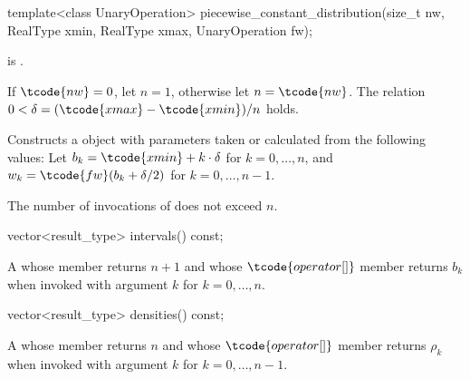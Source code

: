 %
\begin{itemdecl}
template<class UnaryOperation>
 piecewise_constant_distribution(size_t nw, RealType xmin, RealType xmax, UnaryOperation fw);
\end{itemdecl}

\begin{itemdescr}
\pnum
\mandates
{} is .

\pnum
\expects
 If $\tcode{nw} = 0$, let $n = 1$, otherwise let $n = \tcode{nw}$.
 The relation $0 < \delta = (\tcode{xmax} - \tcode{xmin}) / n$
 holds.

\pnum
\effects
Constructs a  object
 with parameters taken or calculated
 from the following values:
 Let $b_k = \tcode{xmin} + k \cdot \delta $ for $ k = 0, \dotsc, n$,
 and $w_k = \tcode{fw}(b_k + \delta / 2) $ for $ k = 0, \dotsc, n - 1$.

\pnum
\complexity
The number of invocations of  does not exceed $n$.
\end{itemdescr}

%
\begin{itemdecl}
vector<result_type> intervals() const;
\end{itemdecl}

\begin{itemdescr}
\pnum
\returns
A 
 whose  member returns $n + 1$
 and whose $ \tcode{operator[]} $ member returns $b_k$
 when invoked with argument $k$ for $k = 0, \dotsc, n $.
\end{itemdescr}

%
\begin{itemdecl}
vector<result_type> densities() const;
\end{itemdecl}

\begin{itemdescr}
\pnum
\returns
A 
 whose  member returns $n$
 and whose $ \tcode{operator[]} $ member returns $\rho_k$
 when invoked with argument $k$ for $k = 0, \dotsc, n - 1$.
\end{itemdescr}



